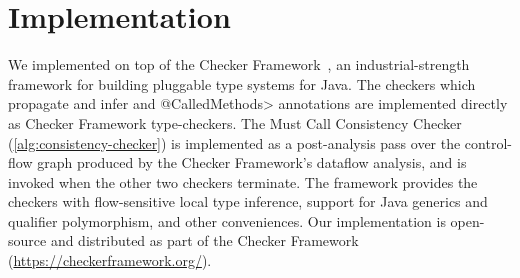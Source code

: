 \section{Implementation}
\label{sec:implementation}

We implemented \tool on top of the Checker Framework~\cite{PapiACPE2008},
an industrial-strength framework for building pluggable type systems
for Java. The checkers which propagate and infer \MustCall and
\<@CalledMethods> annotations are implemented
directly as Checker Framework type-checkers.  The Must Call Consistency
Checker (\cref{alg:consistency-checker}) is
implemented as a post-analysis pass over the control-flow graph
produced by the Checker Framework's dataflow analysis, and is invoked
when the other two checkers terminate. The framework provides the
checkers with flow-sensitive local type
inference, support for Java generics and qualifier polymorphism, and
other conveniences. Our implementation is open-source and
distributed as part of the Checker Framework (\url{https://checkerframework.org/}).


